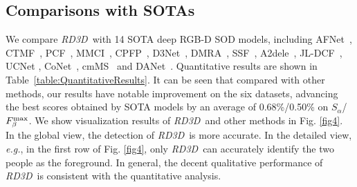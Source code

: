 \documentclass[letterpaper]{article}
\def\ourmodel{\emph{RD3D}}
\begin{document}
\subsection{Comparisons with SOTAs}
We compare \ourmodel~with 14 SOTA deep RGB-D SOD models, including AFNet~\cite{wang2019adaptive}, CTMF~\cite{han2017cnns}, PCF~\cite{chen2018progressively}, MMCI~\cite{chen2019multi}, CPFP~\cite{zhao2019contrast}, D3Net~\cite{fan2020rethinking}, DMRA~\cite{piao2019depth}, SSF~\cite{zhang2020select}, A2dele~\cite{piao2020a2dele}, JL-DCF~\cite{fu2020jl}, UCNet \cite{zhang2020uc,zhang2020uncertainty}, CoNet~\cite{ji2020accurate}, cmMS~\cite{li2020rgb} and DANet~\cite{zhao2020single}. Quantitative results are shown in Table~\ref{table:QuantitativeResults}. It can be seen that compared with other methods, our results have notable improvement on the six datasets, advancing the best scores obtained by SOTA models by an average of 0.68\%/0.50\% on $S_{\alpha}$/$F_\beta^{\rm max}$. We show visualization results of \ourmodel~and other methods in Fig. \ref{fig4}. In the global view, the detection of \ourmodel~is more accurate. In the detailed view, \emph{e.g.}, in the first row of Fig. \ref{fig4}, only \ourmodel~can accurately identify the two people as the foreground. In general, the decent qualitative performance of \ourmodel~is consistent with the quantitative analysis.
\end{document}
